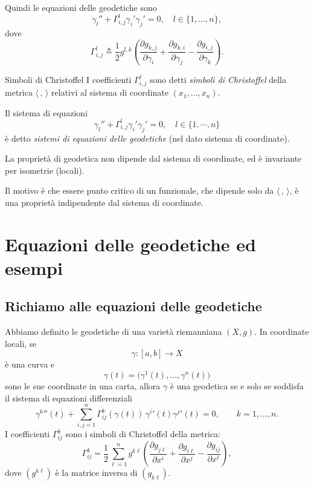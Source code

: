 \documentclass[a4paper]{article}
\begin{document}
Quindi le equazioni delle geodetiche sono
\[
    \gamma_l''
    +
    \Gamma^l_{i,j}\gamma_i'\gamma_j'
    =
    0,
    \quad l \in \{1, \dots, n\},
\]
dove
\[
    \Gamma^l_{i,j}
    \triangleq
    \frac12 g^{l,k}
    \left(
        \frac{\partial g_{k,j}}{\partial \gamma_i}
        +
        \frac{\partial g_{k,i}}{\partial \gamma_j}
        -
        \frac{\partial g_{i,j}}{\partial \gamma_k}
    \right).
\]

\begin{snippetdefinition}{Simboli di Christoffel}
    I coefficienti \(\Gamma^l_{i,j}\) sono detti \emph{simboli di Christoffel}
    della metrica \(\langle\,,\,\rangle\) relativi al sistema di coordinate
    \((x_1,\dots,x_n)\).
\end{snippetdefinition}

Il sistema di equazioni \[
    \gamma_l'' + \Gamma_{i,j}^l \gamma_i' \gamma_j' = 0, \quad l \in \{1, \cdots, n\}
\]
è detto \emph{sistemi di equazioni delle geodetiche} (nel dato sistema di coordinate).

\begin{snippetcorollary}{}
    La proprietà di geodetica non dipende dal sistema di coordinate, ed è invariante per isometrie (locali).
\end{snippetcorollary}

\begin{snippetproof}{}
    Il motivo è che essere punto critico di un funzionale,
    che dipende solo da \(\langle\,,\,\rangle\), è una proprietà indipendente dal sistema di coordinate.
\end{snippetproof}

\pagebreak

\section{Equazioni delle geodetiche ed esempi}


\subsection{Richiamo alle equazioni delle geodetiche}

Abbiamo definito le geodetiche di una varietà riemanniana \((X,g)\). In coordinate locali, se
\[
    \gamma:[a,b]\longrightarrow X
\]
è una curva e
\[
    \gamma(t)=\bigl(\gamma^1(t),\ldots,\gamma^n(t)\bigr)
\]
sono le sue coordinate in una carta, allora \(\gamma\) è una geodetica se e solo se soddisfa il sistema di equazioni differenziali
\[
    \gamma^k{}''(t)
    +
    \sum_{i,j=1}^{n}
    \Gamma^k_{ij}(\gamma(t))\,
    \gamma^i{}'(t)\gamma^j{}'(t)
    =
    0,
    \qquad
    k=1,\ldots,n.
\]
I coefficienti \(\Gamma^k_{ij}\) sono i simboli di Christoffel della metrica:
\[
    \Gamma^k_{ij}
    =
    \frac12
    \sum_{\ell=1}^{n}
    g^{k\ell}
    \left(
        \frac{\partial g_{j\ell}}{\partial x^i}
        +
        \frac{\partial g_{i\ell}}{\partial x^j}
        -
        \frac{\partial g_{ij}}{\partial x^\ell}
    \right),
\]
dove \((g^{k\ell})\) è la matrice inversa di \((g_{k\ell})\).
\end{document}
